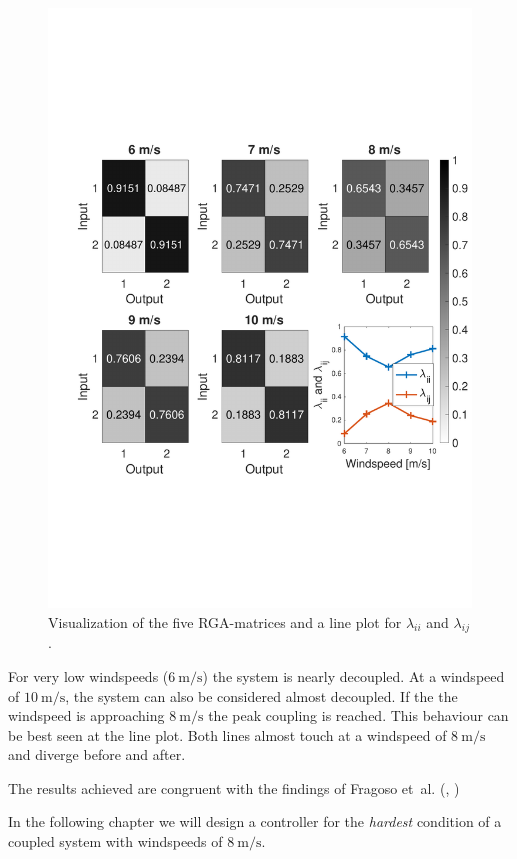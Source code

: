 \begin{figure}[H]
    \center
    \includegraphics[scale=0.6,trim=40 180 0 120,clip]{fig/RGA_results.pdf}
    \caption{Visualization of the five RGA-matrices and a line plot for $\lambda_{ii}$ and $\lambda_{ij}$.}
    \label{fig:analysis:RGA_results}
\end{figure}

For very low windspeeds ($\SI{6}{\metre\per\second}$) the system is nearly decoupled.
At a windspeed of $\SI{10}{\metre\per\second}$, the system can also be considered almost decoupled.
If the the windspeed is approaching $\SI{8}{\metre\per\second}$ the peak coupling is reached.
This behaviour can be best seen at the line plot.
Both lines almost touch at a windspeed of $\SI{8}{\metre\per\second}$ and diverge before and after.

The results achieved are congruent with the findings of Fragoso et~al. (\cite[p. 7]{Fragoso_et_al_2017}, \cite[p. 123]{Fragoso_PhD_2016})

In the following chapter we will design a controller for the \textit{hardest} condition of a coupled system with windspeeds of $\SI{8}{\metre\per\second}$.
